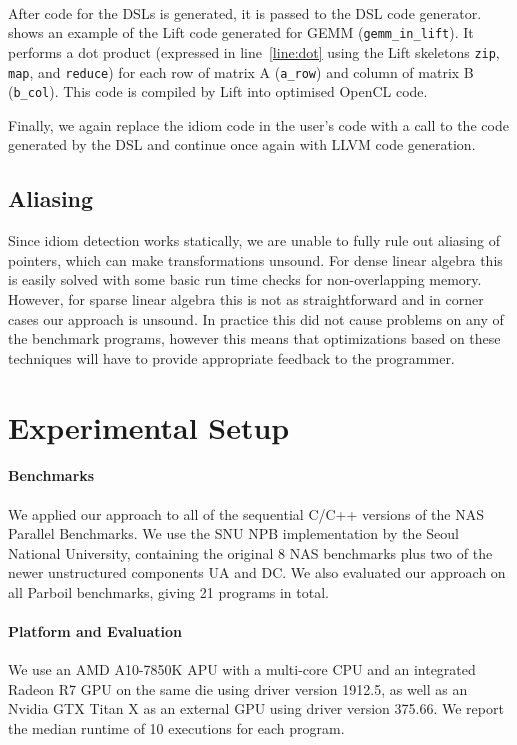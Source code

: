 \paragraph{}
After code for the DSLs is generated, it is passed to the DSL code generator.
 shows an example of the Lift code generated for GEMM (\texttt{gemm\_in\_lift}).
It performs a dot product (expressed in line~\ref{line:dot} using the Lift skeletons \texttt{zip}, \texttt{map}, and \texttt{reduce}) for each row of matrix A (\texttt{a\_row}) and column of matrix B (\texttt{b\_col}).
This code is compiled by Lift into optimised OpenCL code.

Finally, we again replace the idiom code in the user's code with a call to the code generated by the DSL and continue once again with LLVM code generation.

\subsection{Aliasing}

    Since idiom detection works statically, we are unable to fully rule out
    aliasing of pointers, which can make transformations unsound.
    For dense linear algebra this is easily solved with some basic run time
    checks for non-overlapping memory.
    However, for sparse linear algebra this is not as straightforward and in
    corner cases our approach is unsound.
    In practice this did not cause problems on any of the benchmark programs,
    however this means that optimizations based on these techniques will have to
    provide appropriate feedback to the programmer.

\section{Experimental Setup}

    \paragraph*{Benchmarks}
    We applied our approach to all of the sequential C/C++ versions of the NAS
    Parallel Benchmarks.
    We use the SNU NPB implementation by the Seoul National University,
    containing the original 8 NAS benchmarks plus two of the newer unstructured
    components UA and DC.
    We also evaluated our approach on all Parboil benchmarks, giving 21 programs
    in total. 

    \paragraph*{Platform and Evaluation}
    We use an AMD A10-7850K APU with a multi-core CPU and an integrated Radeon
    R7 GPU on the same die using driver version 1912.5, as well as an Nvidia GTX
    Titan X as an external GPU using driver version 375.66.
    We report the median runtime of 10 executions for each program.

